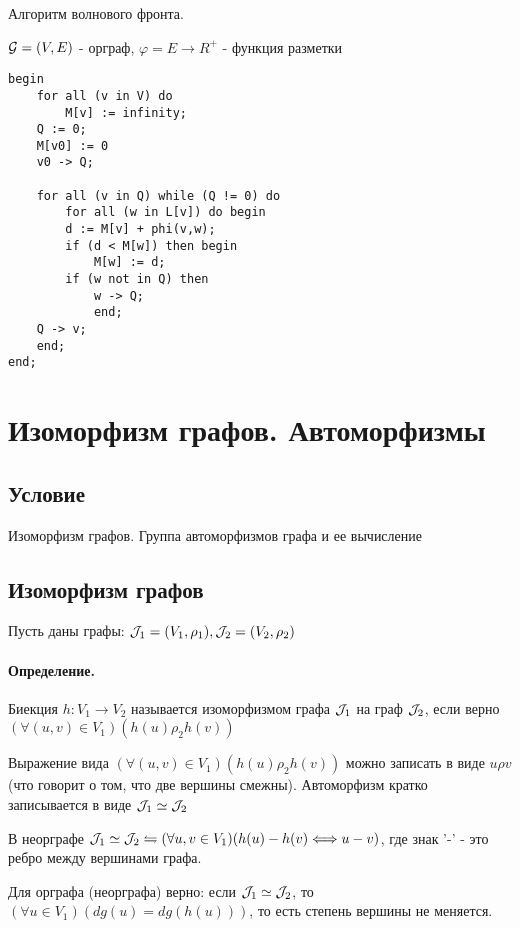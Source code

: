 \documentclass{report}
\begin{document}
Алгоритм волнового фронта.

${\cal G} = (V, E)$ - орграф, $\varphi = E \to R^{+}$ - функция разметки

\begin{lstlisting}
begin
    for all (v in V) do
        M[v] := infinity;
    Q := 0;
    M[v0] := 0
    v0 -> Q;

    for all (v in Q) while (Q != 0) do
        for all (w in L[v]) do begin
	    d := M[v] + phi(v,w);
	    if (d < M[w]) then begin
	        M[w] := d;
		if (w not in Q) then
		    w -> Q;
            end;
	Q -> v;
    end;
end;	
\end{lstlisting}

\newpage

\section{Изоморфизм графов. Автоморфизмы}
\subsection{Условие}
Изоморфизм графов. Группа автоморфизмов графа и ее вычисление

\subsection{Изоморфизм графов}
Пусть даны графы: $ {\cal J}_{1} = (V_1, \rho_{1}), {\cal J}_{2} = (V_2, \rho_2)$

\paragraph*{Определение.}
Биекция $h: V_1 \to V_2$ называется изоморфизмом графа $ {\cal J}_{1}$ на
граф $ {\cal J}_{2}$, если верно $(\forall (u,v) \in V_1)(h(u)\rho_2h(v))$

\medskip

Выражение вида $(\forall (u,v) \in V_1)(h(u)\rho_2h(v))$ можно записать в виде
$u\rho v$ (что говорит о том, что две вершины смежны). Автоморфизм кратко
записывается в виде 
$
{\cal J}_{1} \simeq {\cal J}_{2}
$
\medskip

В неорграфе $ {\cal J}_{1} \simeq {\cal J}_{2} \leftrightharpoons
(\forall u,v \in V_1)(h(u)-h(v) \Longleftrightarrow u-v)$, где знак '-' - это ребро между
вершинами графа.

\medskip

Для орграфа (неорграфа) верно: если $ {\cal J}_{1} \simeq {\cal J}_{2}$, то
$(\forall u \in  V_1)(dg(u) = dg(h(u)))$, то есть степень вершины не меняется.
\end{document}
